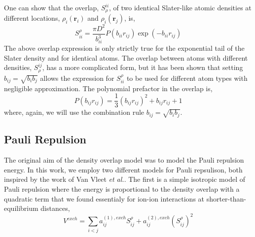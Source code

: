 \documentclass[journal=jacsat,manuscript=article]{achemso}
\begin{document}
One can show that the overlap, $S^{ii}_\rho$, of two identical Slater-like atomic densities
at different locations, $\rho_i(\bm{r}_i)$ and $\rho_i(\bm{r}_j)$, is,
\begin{equation}
  S_{ii}^\rho=\frac{\pi D^2}{b_{ii}^3}P(b_{ii}r_{ij})\exp(-b_{ii}r_{ij})
\end{equation}
The above overlap expression is only strictly true for the exponential tail
of the Slater density and for identical atoms. The overlap between atoms
with different densities, $S^{ij}_\rho$, has a more complicated form, but
it has been shown that setting $b_{ij}=\sqrt{b_ib_j}$ allows the expression
for $S_{ii}^\rho$ to be used for different atom types with negligible
approximation\cite{van2016beyond}. The polynomial prefactor in the overlap is,
\begin{equation}
  P(b_{ij}r_{ij})=\frac13(b_{ij}r_{ij})^2 + b_{ij}r_{ij}+1
\end{equation}
where, again, we will use the combination rule $b_{ij}=\sqrt{b_ib_j}$.

\subsection*{Pauli Repulsion}
The original aim of the density overlap model was to model the
Pauli repulsion energy.\cite{wallqvist1989new,wheatley1990overlap,gordon1996approximate}
In this work, we employ two different models for Pauli repsulison,
both inspired by the work of Van Vleet \textit{et al.}\cite{van2016beyond,van2018new}.
The first is a simple isotropic model of Pauli repulsion where the energy is proportional
to the density overlap with a quadratic term that we found essentialy for ion-ion interactions
at shorter-than-equilibrium distances,
\begin{equation}
  V^{exch} = \sum_{i<j}a_{ij}^{(1),exch}S_{ij}^\rho+a_{ij}^{(2),exch}(S_{ij}^\rho)^2
  \label{eq:exch_iso}
\end{equation}
\end{document}
